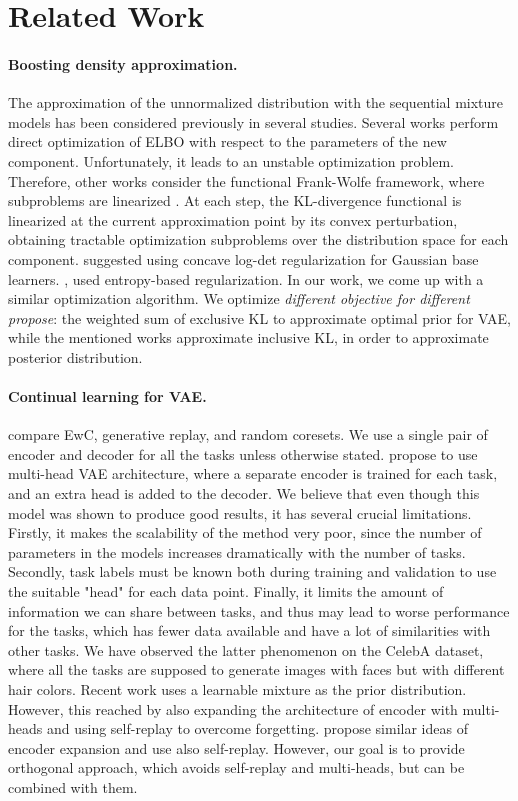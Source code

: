 \section{Related Work}
\paragraph{Boosting density approximation.}
The approximation of the unnormalized distribution with the sequential mixture models has been considered previously in several studies. Several works \citep{miller2017variational,gershman2012nonparametric} perform direct optimization of ELBO with respect to the parameters of the new component. Unfortunately, it leads to an unstable optimization problem. Therefore, other works consider the functional Frank-Wolfe framework, where subproblems are linearized \citep{wang2015functional}. At each step, the KL-divergence functional is linearized at the current approximation point by its convex perturbation, obtaining tractable optimization subproblems over the distribution space for each component. \citet{guo2016boosting} suggested using concave log-det regularization for Gaussian base learners. \citet{egorov2019maxentropy}, \citet{locatello2018boosting} used entropy-based regularization. In our work, we come up with a similar optimization algorithm. We optimize \textit{different objective for different propose}: the weighted sum of exclusive KL to approximate optimal prior for VAE, while the mentioned works approximate inclusive KL, in order to approximate posterior distribution. 
\paragraph{Continual learning for VAE.}
\citep{lesort2019generative} compare EwC, generative replay, and random coresets. We use a single pair of encoder and decoder for all the tasks unless otherwise stated. \cite{nguyen2017variational} propose to use multi-head VAE architecture, where a separate encoder is trained for each task, and an extra head is added to the decoder. We believe that even though this model was shown to produce good results, it has several crucial limitations. Firstly, it makes the scalability of the method very poor, since the number of parameters in the models increases dramatically with the number of tasks. Secondly, task labels must be known both during training and validation to use the suitable "head" for each data point. Finally, it limits the amount of information we can share between tasks, and thus may lead to worse performance for the tasks, which has fewer data available and have a lot of similarities with other tasks. We have observed the latter phenomenon on the CelebA dataset, where all the tasks are supposed to generate images with faces but with different hair colors. Recent work \citep{rao2019continual} uses a learnable mixture as the prior distribution. However, this reached by also expanding the architecture of encoder with multi-heads and using self-replay to overcome forgetting. \citet{achillelife} propose similar ideas of encoder expansion and use also self-replay. However, our goal is to provide orthogonal approach, which avoids self-replay and multi-heads, but can be combined with them.
